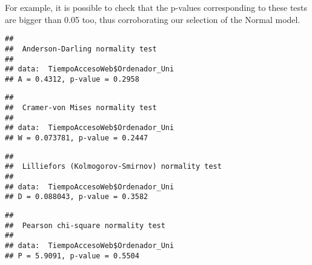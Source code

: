 \documentclass[
]{article}
\newenvironment{Shaded}{\begin{snugshade}}{\end{snugshade}}
\newcommand{\FunctionTok}[1]{\textcolor[rgb]{0.13,0.29,0.53}{\textbf{#1}}}
\newcommand{\NormalTok}[1]{#1}
\newcommand{\SpecialCharTok}[1]{\textcolor[rgb]{0.81,0.36,0.00}{\textbf{#1}}}
\begin{document}
For example, it is possible to check that the p-values corresponding to
these tests are bigger than 0.05 too, thus corroborating our selection
of the Normal model.

\begin{Shaded}
\end{Shaded}

\begin{verbatim}
## 
##  Anderson-Darling normality test
## 
## data:  TiempoAccesoWeb$Ordenador_Uni
## A = 0.4312, p-value = 0.2958
\end{verbatim}

\begin{Shaded}
\end{Shaded}

\begin{verbatim}
## 
##  Cramer-von Mises normality test
## 
## data:  TiempoAccesoWeb$Ordenador_Uni
## W = 0.073781, p-value = 0.2447
\end{verbatim}

\begin{Shaded}
\end{Shaded}

\begin{verbatim}
## 
##  Lilliefors (Kolmogorov-Smirnov) normality test
## 
## data:  TiempoAccesoWeb$Ordenador_Uni
## D = 0.088043, p-value = 0.3582
\end{verbatim}

\begin{Shaded}
\end{Shaded}

\begin{verbatim}
## 
##  Pearson chi-square normality test
## 
## data:  TiempoAccesoWeb$Ordenador_Uni
## P = 5.9091, p-value = 0.5504
\end{verbatim}
\end{document}
